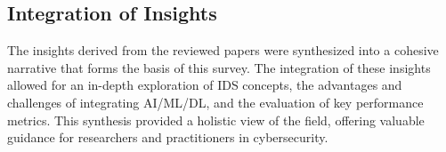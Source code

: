 \subsection{Integration of Insights} The insights derived from the reviewed papers were synthesized into a cohesive narrative that forms the basis of this survey. The integration of these insights allowed for an in-depth exploration of IDS concepts, the advantages and challenges of integrating AI/ML/DL, and the evaluation of key performance metrics. This synthesis provided a holistic view of the field, offering valuable guidance for researchers and practitioners in cybersecurity.